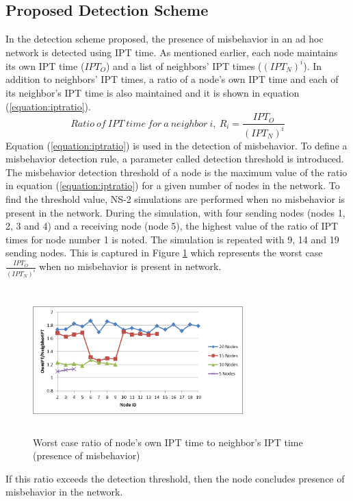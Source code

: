 \documentclass[12pt,letterpaper,english]{article}
\begin{document}
\subsection{Proposed Detection Scheme}
\label{subsection:detectionscheme}
\indent In the detection scheme proposed, the presence of misbehavior in an ad hoc network is detected using IPT time.
As mentioned earlier, each node maintains its own IPT time ($IPT_O$) and a list of neighbors' IPT times ($(IPT_N)^i$). In addition to neighbors' IPT times, a ratio of a node's own IPT time and each of its neighbor's IPT time is also maintained and it is shown in equation (\ref{equation:iptratio}).
\begin{equation}
\label{equation:iptratio}
Ratio\ of\ IPT\ time\ for\ a\ neighbor\ i,\ R_i = \frac{IPT_O}{(IPT_N)^i}
\end{equation}
Equation (\ref{equation:iptratio}) is used in the detection of misbehavior.
To define a misbehavior detection rule, a parameter called detection threshold is introduced. The misbehavior detection threshold of a node is the maximum value of the ratio in equation (\ref{equation:iptratio}) for a given number of nodes in the network. To find the threshold value, NS-2 simulations are performed when no misbehavior is present in the network. During the simulation, with four sending nodes (nodes 1, 2, 3 and 4) and a receiving node (node 5), the highest value of the ratio of IPT times for node number 1 is noted. The simulation is repeated with 9, 14 and 19 sending nodes. This is captured in Figure \ref{figure:worstcaseratio} which represents the worst case $\frac{IPT_O}{(IPT_N)^i}$ when no misbehavior is present in network. 
\begin{figure}[H]
\centering
\includegraphics[width=3.2in,height=2.2in]{figures/worstcaseratio.png}
\caption{Worst case ratio of node's own IPT time to neighbor's IPT time (presence of misbehavior)}
\label{figure:worstcaseratio}
\end{figure}
If this ratio exceeds the detection threshold, then the node concludes presence of misbehavior in the network.
\end{document}
